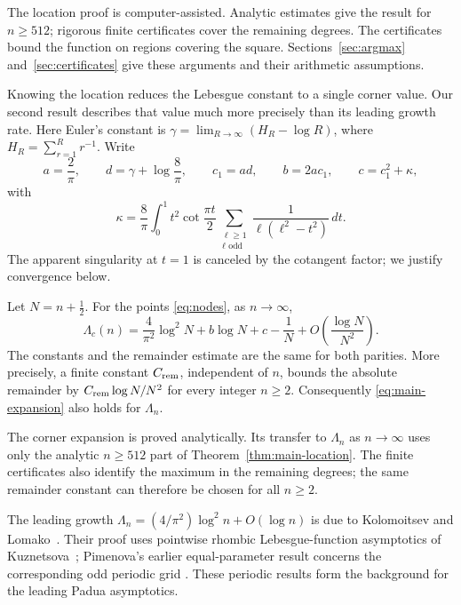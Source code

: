 The location proof is computer-assisted. Analytic estimates give the result
for $n\geq512$; rigorous finite certificates cover the remaining degrees.
The certificates bound the function on regions covering the square.
Sections~\ref{sec:argmax} and~\ref{sec:certificates} give these arguments
and their arithmetic assumptions.

Knowing the location reduces the Lebesgue constant to a single corner
value. Our second result describes that value much more precisely than
its leading growth rate. Here Euler's constant is
$\gamma=\lim_{R\to\infty}(H_R-\log R)$, where
$H_R=\sum_{r=1}^R r^{-1}$. Write
\begin{equation}\label{eq:main-constants}
 a=\frac2\pi,\qquad d=\gamma+\log\frac8\pi,\qquad
 c_1=ad,\qquad b=2ac_1,\qquad c=c_1^2+\kappa,
\end{equation}
with
\begin{equation}\label{eq:main-kappa}
 \kappa=\frac8\pi\int_0^1 t^2\cot\frac{\pi t}{2}
       \sum_{\substack{\ell\geq1\\\ell\text{ odd}}}
       \frac{1}{\ell(\ell^2-t^2)}\,dt.
\end{equation}
The apparent singularity at $t=1$ is canceled by the cotangent factor;
we justify convergence below.

\begin{theorem}\label{thm:main-expansion}
Let $N=n+\tfrac12$. For the points \eqref{eq:nodes}, as $n\to\infty$,
\begin{equation}\label{eq:main-expansion}
 \Lambda_c(n)=\frac4{\pi^2}\log^2N+b\log N+c-\frac1N
            +O\!\left(\frac{\log N}{N^2}\right).
\end{equation}
The constants and the remainder estimate are the same for both parities.
More precisely, a finite constant $C_{\rm rem}$, independent of $n$, bounds the
absolute remainder by $C_{\rm rem}\log N/N^2$ for every integer $n\geq2$.
Consequently \eqref{eq:main-expansion} also holds for $\Lambda_n$.
\end{theorem}

The corner expansion is proved analytically. Its transfer to $\Lambda_n$
as $n\to\infty$ uses only the analytic $n\geq512$ part of
Theorem~\ref{thm:main-location}. The finite certificates also identify the
maximum in the remaining degrees; the same remainder constant can therefore
be chosen for all $n\geq2$.

The leading growth
$\Lambda_n=(4/\pi^2)\log^2n+O(\log n)$ is due to
Kolomoitsev and Lomako~\cite[Theorem~2.1 and the following Padua consequence]{KolomoitsevLomako2021}.
Their proof uses pointwise rhombic Lebesgue-function asymptotics of
Kuznetsova~\cite[Theorem~1]{Kuznetsova1995}; Pimenova's earlier equal-parameter
result concerns the corresponding odd periodic grid
\cite[Theorem~1]{Pimenova1979}. These periodic results form the background
for the leading Padua asymptotics.

